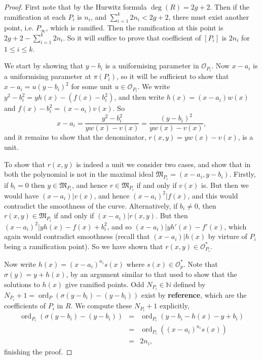 \documentclass[11pt]{article} %
\theoremstyle{remark}\newtheorem*{rem}{Remark}
\DeclareMathOperator{\ord}{ord}
\begin{document}
\begin{proof}
 First note that by the Hurwitz formula $\deg(R) = 2g+2$.
 Then if the ramification at each $P_i$ is $n_i$, and $\sum_{i=1}^k 2n_i < 2g+2$, there must exist another point, i.e. $P_{\infty}$, which is ramified.
 Then the ramification at this point is $2g+2-\sum _{i=1}^k2n_i$.
 So it will suffice to prove that coefficient of $[P_i]$ is $2n_i$ for $1\leq i \leq k$.
 
 We start by showing that $y-b_i$ is a uniformising parameter in $\mathscr O_{P_i}$.
 Now $x-a_i$ is a uniformising parameter at $\pi(P_i)$, so it will be sufficient to show that $x-a_i = u(y-b_i)^2$ for some unit $u\in \mathscr O_{P_i}$.
 We write $y^2-b_i^2 = yh(x)-(f(x)-b_i^2)$, and then write $h(x)=(x-a_i)w(x)$ and $f(x)-b_i^2=(x-a_i)v(x)$.
 So 
 \[
x-a_i = \frac{y^2-b_i^2}{yw(x)-v(x)} = \frac{(y-b_i)^2}{yw(x)-v(x)},
 \]
and it remains to show that the denominator, $r(x,y) = yw(x)-v(x)$, is a unit.

To show that $r(x,y)$ is indeed a unit we consider two cases, and show that in both the polynomial is not in the maximal ideal $\mathfrak M_{P_i}=(x-a_i,y-b_i)$.
Firstly, if $b_i=0$ then $y\in \mathfrak{M}_{P_i}$, and hence $r\in \mathfrak M_{P_i}$ if and only if $v(x)$ is.
But then we would have $(x-a_i)|v(x)$, and hence $(x-a_i)^2|f(x)$, and this would contradict the smoothness of the curve.
Alternatively, if $b_i\neq 0$, then $r(x,y)\in \mathfrak M_{P_i}$ if and only if $(x-a_i)|r(x,y)$.
But then $(x-a_i)^2|yh(x)-f(x) + b_i^2$, and so $(x-a_i)|yh'(x)-f'(x)$, which again would contradict smoothness (recall that $(x-a_i)|h(x)$ by virture of $P_i$ being a ramification point).
So we have shown that $r(x,y)\in \mathscr O_{P_i}^*$.

Now write $h(x)=(x-a_i)^{n_i}s(x)$ where $s(x)\in \mathscr O_p^*$.
Note that $\sigma (y)=y+h(x)$, by an argument similar to that used to show that the solutions to $h(x)$ give ramified points.
Odd $N_{P_i}\in \mathbb N$ defined by $N_{P_i}+1=\ord_P(\sigma(y - b_i) - (y-b_i))$ exist by {\bf reference}, which are the coefficients of $P_i$ in $R$.
We compute these $N_{P_i}+1$ explicitly,
\begin{eqnarray*}
 \ord_{P_i}(\sigma(y-b_i)-(y-b_i)) & = & \ord_{P_i}(y-b_i-h(x)-y+b_i)\\
 & = & \ord_{P_i}((x-a_i)^{n_i}s(x))\\
 & = & 2n_i,
\end{eqnarray*}
finishing the proof.
\end{proof}
\end{document}
